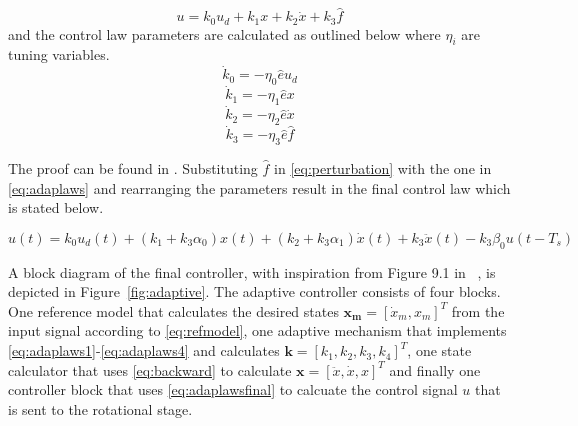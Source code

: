 \begin{equation}
  \label{eq:adaplaws}
  u = k_0u_d + k_1x + k_2\dot{x} + k_3\hat{f}
\end{equation}
and the control law parameters are calculated as outlined below where $\eta_i$ are tuning variables.
\begin{equation}
  \label{eq:adaplaws1}
  \dot{k}_0 = -\eta_0\hat{e}u_d
\end{equation}
\begin{equation}
  \label{eq:adaplaws2}
  \dot{k}_1 = -\eta_1\hat{e}x
\end{equation}
\begin{equation}
  \label{eq:adaplaws3}
  \dot{k}_2 = -\eta_2\hat{e}\dot{x}
\end{equation}
\begin{equation}
  \label{eq:adaplaws4}
  \dot{k}_3 = -\eta_3\hat{e}\hat{f}
\end{equation}

The proof can be found in \citep{Qingson:2016}. Substituting $\hat{f}$ in \eqref{eq:perturbation} with the one in \eqref{eq:adaplaws} and rearranging the parameters result in the final \abbrMRACPE control law which is stated below.

\begin{equation}
    \label{eq:adaplawsfinal}
  u(t) = k_0u_d(t) + (k_1 + k_3\alpha_0)x(t) +  (k_2 + k_3\alpha_1)\dot{x}(t) + k_3\ddot{x}(t) - k_3\beta_0u(t-T_s)
\end{equation}

A block diagram of the final controller, with inspiration from Figure 9.1 in ~\citep{Qingson:2016}, is depicted in Figure~\ref{fig:adaptive}. The adaptive controller consists of four blocks. One reference model that calculates the desired states $\mathbf{x_m}=[\dot{x}_m, x_m]^T$ from the input signal according to \eqref{eq:refmodel}, one adaptive mechanism that implements \eqref{eq:adaplaws1}-\eqref{eq:adaplaws4} and calculates $\mathbf{k}=[k_1, k_2, k_3, k_4]^T$, one state calculator that uses \eqref{eq:backward} to calculate $\mathbf{x}=[\ddot{x}, \dot{x}, x]^T$ and finally one controller block that uses \eqref{eq:adaplawsfinal} to calcuate the control signal $u$ that is sent to the rotational stage.

